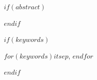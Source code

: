\maketitle

$if(abstract)$
\begin{abstract}
$abstract$
\end{abstract}
$endif$

$if(keywords)$
\begin{keywords}
$for(keywords)$$it$$sep$, $endfor$
\end{keywords}
$endif$

